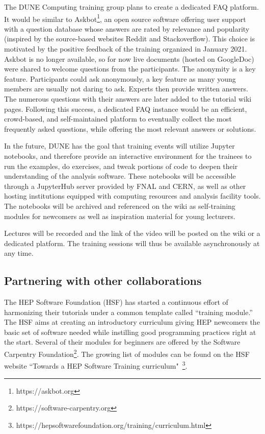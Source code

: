 \documentclass[../main-v1.tex]{subfiles}
\begin{document}
The DUNE Computing training group plans to create a dedicated FAQ platform. It would be similar to  Askbot\footnote{https://askbot.org}, an open source software offering user support with a question database whose answers are rated by relevance and popularity (inspired by the source-based websites Reddit and Stackoverflow). This choice is motivated by the positive feedback of the training organized in January 2021. Askbot is no longer available, so for now live documents (hosted on GoogleDoc) were shared to welcome questions from the participants. The anonymity is a key feature. Participants could ask anonymously, a key feature as many young members are usually not daring to ask. Experts then provide written answers. The numerous questions with their answers are later added to the tutorial wiki pages. Following this success, a dedicated FAQ instance would be an efficient, crowd-based, and self-maintained platform to eventually collect the most frequently asked questions, while offering the most relevant answers or solutions.

In the future, DUNE has the goal that training events will utilize Jupyter notebooks, and therefore provide an interactive environment for the trainees to run the examples, do exercises, and tweak portions of code to deepen their understanding of the analysis software. These notebooks will be accessible through a JupyterHub server provided by FNAL and CERN, as well as other hosting institutions equipped with computing resources and analysis facility tools. The notebooks will be archived and referenced on the wiki as self-training modules for newcomers as well as inspiration material for young lecturers.

Lectures will be recorded and the link of the video will be posted on the wiki or a dedicated platform. The training sessions will thus be available asynchronously at any time.

\subsection{Partnering with other collaborations}
The HEP Software Foundation (HSF) has started a continuous effort of harmonizing their tutorials under a common template called “training module.” The HSF aims at creating an introductory curriculum giving HEP newcomers the basic set of software needed while instilling good programming practices right at the start. Several of their modules for beginners are offered by the Software Carpentry Foundation\footnote{https://software-carpentry.org }. The growing list of modules can be found on the HSF website “Towards a HEP Software Training curriculum"~\footnote{https://hepsoftwarefoundation.org/training/curriculum.html}.
\end{document}
